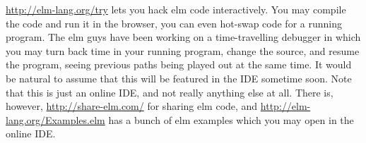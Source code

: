 \url{http://elm-lang.org/try} lets you hack elm code interactively. You may 
compile the code and run it in the browser, you can even hot-swap code for a 
running program. The elm guys have been working on a time-travelling debugger 
in which you may turn back time in your running program, change the source, 
and resume the program, seeing previous paths being played out at the same 
time. It would be natural to assume that this will be featured in the IDE 
sometime soon. Note that this is just an online IDE, and not really anything 
else at all. There is, however, \url{http://share-elm.com/} for sharing elm 
code, and \url{http://elm-lang.org/Examples.elm} has a bunch of elm examples 
which you may open in the online IDE.
